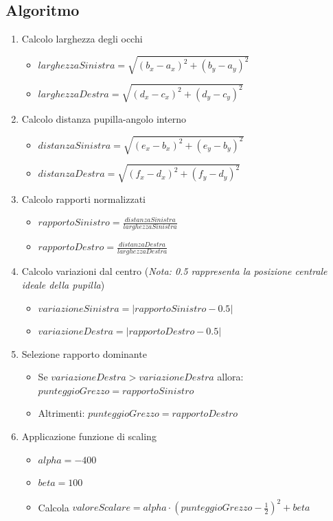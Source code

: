 \documentclass[12pt,a4paper,openright,twoside]{book}
\begin{document}
\subsection{Algoritmo}
\begin{enumerate}
    \item Calcolo larghezza degli occhi \begin{itemize}
        \item \(larghezzaSinistra = \sqrt{(b_x - a_x)^2 + (b_y - a_y)^2}\)
        \item \(larghezzaDestra = \sqrt{(d_x - c_x)^2 + (d_y - c_y)^2}\)
    \end{itemize}
    \item Calcolo distanza pupilla-angolo interno \begin{itemize}
        \item \(distanzaSinistra = \sqrt{(e_x - b_x)^2 + (e_y - b_y)^2}\)
        \item \(distanzaDestra = \sqrt{(f_x - d_x)^2 + (f_y - d_y)^2}\)
    \end{itemize}
    \item Calcolo rapporti normalizzati \begin{itemize}
        \item \(rapportoSinistro = \frac{distanzaSinistra}{larghezzaSinistra}\)
        \item \(rapportoDestro = \frac{distanzaDestra}{larghezzaDestra}\)
    \end{itemize}
    \item Calcolo variazioni dal centro (\textit{Nota: 0.5 rappresenta la posizione centrale ideale della pupilla}) \begin{itemize}
        \item \(variazioneSinistra = |rapportoSinistro - 0.5| \)
        \item \(variazioneDestra = |rapportoDestro - 0.5| \)
    \end{itemize}
    \item Selezione rapporto dominante \begin{itemize}
        \item Se \(variazioneDestra > variazioneDestra \) allora: \(punteggioGrezzo = rapportoSinistro \)
        \item Altrimenti: \(punteggioGrezzo = rapportoDestro\)
    \end{itemize}
    \item Applicazione funzione di scaling \begin{itemize}
        \item \(alpha = -400\)
        \item \(beta = 100 \)
        \item Calcola \(valoreScalare = alpha \cdot (punteggioGrezzo - \frac{1}{2})^2 + beta\)
    \end{itemize}
\end{enumerate}
\end{document}
